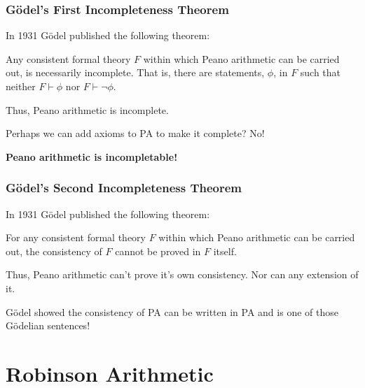 \documentclass{beamer}
\begin{document}
\begin{frame}
	\frametitle{G\"{o}del's First Incompleteness Theorem}
	
	In 1931 G\"{o}del published the following theorem:
	
	\vspace{0.5cm}
	
	Any consistent formal theory $F$ within which Peano arithmetic can be carried out, is necessarily incomplete. That is, there are statements, $\phi$, in $F$ such that neither $F \vdash \phi$ nor $F \vdash \lnot \phi$. 
	
	\vspace{0.5cm} 
	
	Thus, Peano arithmetic is incomplete. 
	
	\vspace{0.5cm}
	
	Perhaps we can add axioms to PA to make it complete? No!  
	
	\vspace{0.5cm} 
	
	{\bf Peano arithmetic is incompletable!}
	
\end{frame}

\begin{frame}
	\frametitle{G\"{o}del's Second Incompleteness Theorem}
	
	In 1931 G\"{o}del published the following theorem:
	
	\vspace{0.5cm}
	
	For any consistent formal theory $F$ within which Peano arithmetic can be carried out, the consistency of $F$ cannot be proved in $F$ itself. 
	
	\vspace{0.5cm} 
	
	Thus, Peano arithmetic can't prove it's own consistency. Nor can any extension of it. 
	
	\vspace{0.5cm} 
	
	G\"{o}del showed the consistency of PA can be written in PA and is one of those G\"{o}delian sentences!
	
\end{frame}

\section{Robinson Arithmetic}
\end{document}
